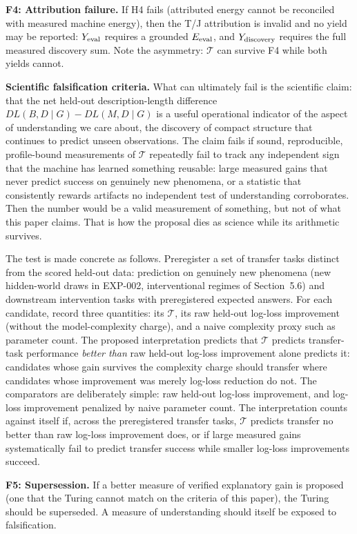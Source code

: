 \documentclass[11pt]{article}
\begin{document}
\textbf{F4: Attribution failure.} If H4 fails (attributed energy cannot be reconciled with measured machine energy), then the T/J attribution is invalid and no yield may be reported: \(Y_{\rm eval}\) requires a grounded \(E_{\rm eval}\), and \(Y_{\rm discovery}\) requires the full measured discovery sum. Note the asymmetry: \(\mathcal{T}\) can survive F4 while both yields cannot.

\textbf{Scientific falsification criteria.} What can ultimately fail is the scientific claim: that the net held-out description-length difference \(DL(B,D\mid G)-DL(M,D\mid G)\) is a useful operational indicator of the aspect of understanding we care about, the discovery of compact structure that continues to predict unseen observations. The claim fails if sound, reproducible, profile-bound measurements of \(\mathcal{T}\) repeatedly fail to track any independent sign that the machine has learned something reusable: large measured gains that never predict success on genuinely new phenomena, or a statistic that consistently rewards artifacts no independent test of understanding corroborates. Then the number would be a valid measurement of something, but not of what this paper claims. That is how the proposal dies as science while its arithmetic survives.

The test is made concrete as follows. Preregister a set of transfer tasks distinct from the scored held-out data: prediction on genuinely new phenomena (new hidden-world draws in EXP-002, interventional regimes of Section~5.6) and downstream intervention tasks with preregistered expected answers. For each candidate, record three quantities: its \(\mathcal{T}\), its raw held-out log-loss improvement (without the model-complexity charge), and a naive complexity proxy such as parameter count. The proposed interpretation predicts that \(\mathcal{T}\) predicts transfer-task performance \textit{better than} raw held-out log-loss improvement alone predicts it: candidates whose gain survives the complexity charge should transfer where candidates whose improvement was merely log-loss reduction do not. The comparators are deliberately simple: raw held-out log-loss improvement, and log-loss improvement penalized by naive parameter count. The interpretation counts against itself if, across the preregistered transfer tasks, \(\mathcal{T}\) predicts transfer no better than raw log-loss improvement does, or if large measured gains systematically fail to predict transfer success while smaller log-loss improvements succeed.

\textbf{F5: Supersession.} If a better measure of verified explanatory gain is proposed (one that the Turing cannot match on the criteria of this paper), the Turing should be superseded. A measure of understanding should itself be exposed to falsification.
\end{document}
